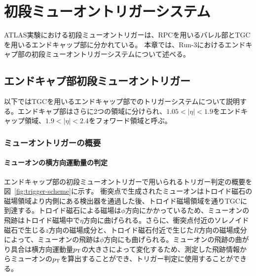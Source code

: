 \chapter{初段ミューオントリガーシステム}\label{chapter3}
ATLAS実験における初段ミューオントリガーは、RPCを用いるバレル部とTGCを用いるエンドキャップ部に分かれている。
本章では、Run-3におけるエンドキャプ部の初段ミューオントリガーシステムについて述べる。

\section{エンドキャプ部初段ミューオントリガー}
以下ではTGCを用いるエンドキャップ部でのトリガーシステムについて説明する。エンドキャプ部はさらに2つの領域に分けられ、$1.05 < |\eta| < 1.9$をエンドキャップ領域、$1.9 < |\eta| < 2.4$をフォワード領域と呼ぶ。

\subsection{ミューオントリガーの概要}\label{section:CW}

\subsubsection{ミューオンの横方向運動量の判定}
エンドキャップ部の初段ミューオントリガーで用いられるトリガー判定の概要を図~\ref{fig:trigger-scheme}に示す。
衝突点で生成されたミューオンはトロイド磁石の磁場領域より内側にある検出器を通過した後、トロイド磁場領域を通りTGCに到達する。トロイド磁石による磁場は$\phi$方向にかかっているため、ミューオンの飛跡はトロイド磁場中で$\eta$方向に曲げられる。さらに、衝突点付近のソレノイド磁石で生じる$z$方向の磁場成分と、トロイド磁石付近で生じた$R$方向の磁場成分によって、ミューオンの飛跡は$\phi$方向にも曲げられる。ミューオンの飛跡の曲がり具合は横方向運動量$p_{\rm{T}}$の大きさによって変化するため、測定した飛跡情報からミューオンの$p_{\rm{T}}$を算出することができ、トリガー判定に使用することができる。

